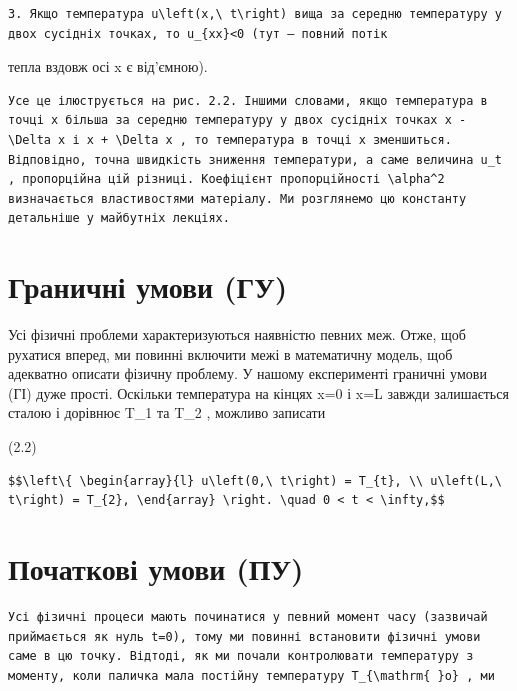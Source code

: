 \documentclass[
  ukrainian,
]{article}
\begin{document}
\begin{verbatim}
3. Якщо температура u\left(x,\ t\right) вища за середню температуру у двох сусідніх точках, то u_{xx}<0 (тут — повний потік
\end{verbatim}

тепла вздовж осі x є від'ємною).

\begin{verbatim}
Усе це ілюструється на рис. 2.2. Іншими словами, якщо температура в точці x більша за середню температуру у двох сусідніх точках x - \Delta x і x + \Delta x , то температура в точці x зменшиться. Відповідно, точна швидкість зниження температури, а саме величина u_t , пропорційна цій різниці. Коефіцієнт пропорційності \alpha^2 визначається властивостями матеріалу. Ми розглянемо цю константу детальніше у майбутніх лекціях.
\end{verbatim}

\section{Граничні умови
(ГУ)}\label{ux433ux440ux430ux43dux438ux447ux43dux456-ux443ux43cux43eux432ux438-ux433ux443}

Усі фізичні проблеми характеризуються наявністю певних меж. Отже, щоб
рухатися вперед, ми повинні включити межі в математичну модель, щоб
адекватно описати фізичну проблему. У нашому експерименті граничні умови
(ГІ) дуже прості. Оскільки температура на кінцях x=0 і x=L завжди
залишається сталою і дорівнює T\_1 та T\_2 , можливо записати

(2.2)

\begin{verbatim}
$$\left\{ \begin{array}{l} u\left(0,\ t\right) = T_{t}, \\ u\left(L,\ t\right) = T_{2}, \end{array} \right. \quad 0 < t < \infty,$$
\end{verbatim}

\section{Початкові умови
(ПУ)}\label{ux43fux43eux447ux430ux442ux43aux43eux432ux456-ux443ux43cux43eux432ux438-ux43fux443}

\begin{verbatim}
Усі фізичні процеси мають починатися у певний момент часу (зазвичай приймається як нуль t=0), тому ми повинні встановити фізичні умови саме в цю точку. Відтоді, як ми почали контролювати температуру з моменту, коли паличка мала постійну температуру T_{\mathrm{ }o} , ми
\end{verbatim}
\end{document}
